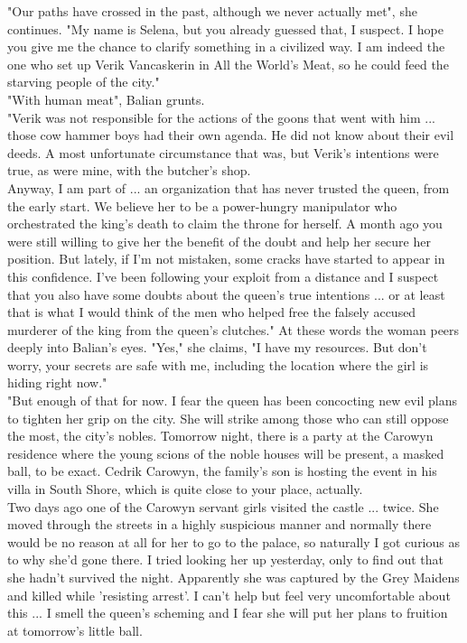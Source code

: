 "Our paths have crossed in the past, although we never actually met", she continues. "My name is Selena, but you already guessed that, I suspect. I hope you give me the chance to clarify something in a civilized way. I am indeed the one who set up Verik Vancaskerin in All the World's Meat, so he could feed the starving people of the city."\\

"With human meat", Balian grunts.\\

"Verik was not responsible for the actions of the goons that went with him ... those cow hammer boys had their own agenda. He did not know about their evil deeds. A most unfortunate circumstance that was, but Verik's intentions were true, as were mine, with the butcher's shop.\\

Anyway, I am part of ... an organization that has never trusted the queen, from the early start. We believe her to be a power-hungry manipulator who orchestrated the king's death to claim the throne for herself. A month ago you were still willing to give her the benefit of the doubt and help her secure her position. But lately, if I'm not mistaken, some cracks have started to appear in this confidence. I've been following your exploit from a distance and I suspect that you also have some doubts about the queen's true intentions ... or at least that is what I would think of the men who helped free the falsely accused murderer of the king from the queen's clutches." At these words the woman peers deeply into Balian's eyes. "Yes," she claims, "I have my resources. But don't worry, your secrets are safe with me, including the location where the girl is hiding right now."\\

"But enough of that for now. I fear the queen has been concocting new evil plans to tighten her grip on the city. She will strike among those who can still oppose the most, the city's nobles. Tomorrow night, there is a party at the Carowyn residence where the young scions of the noble houses will be present, a masked ball, to be exact. Cedrik Carowyn, the family's son is hosting the event in his villa in South Shore, which is quite close to your place, actually.\\

Two days ago one of the Carowyn servant girls visited the castle ... twice. She moved through the streets in a highly suspicious manner and normally there would be no reason at all for her to go to the palace, so naturally I got curious as to why she'd gone there. I tried looking her up yesterday, only to find out that she hadn't survived the night. Apparently she was captured by the Grey Maidens and killed while 'resisting arrest'. I can't help but feel very uncomfortable about this ... I smell the queen's scheming and I fear she will put her plans to fruition at tomorrow's little ball.\\

